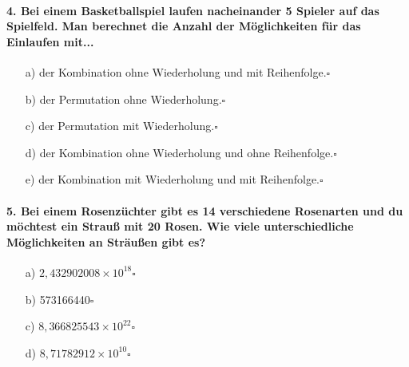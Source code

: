 \documentclass[a4paper]{article}
\begin{document}
\paragraph{4. Bei einem Basketballspiel laufen nacheinander 5 Spieler auf das Spielfeld. Man berechnet die Anzahl der Möglichkeiten für das Einlaufen mit...}
\begin{itemize}
    \item[a)] der Kombination ohne Wiederholung und mit Reihenfolge.\hfill $\square$
    \item[b)] der Permutation ohne Wiederholung.\hfill $\square$
    \item[c)] der Permutation mit Wiederholung.\hfill $\square$
    \item[d)] der Kombination ohne Wiederholung und ohne Reihenfolge.\hfill $\square$
    \item[e)] der Kombination mit Wiederholung und mit Reihenfolge.\hfill $\square$
\end{itemize}
\paragraph{5. Bei einem Rosenzüchter gibt es 14 verschiedene Rosenarten und du möchtest ein Strauß mit 20 Rosen. Wie viele unterschiedliche Möglichkeiten an Sträußen gibt es?}
\begin{itemize}
    \item[a)] $2,432902008 × 10^{18}$\hfill $\square$
    \item[b)]573166440\hfill $\square$
    \item[c)] $8,366825543 × 10^{22}$\hfill $\square$
    \item[d)]$8,71782912 × 10^{10}$\hfill $\square$
\end{itemize}


\newpage
\end{document}
